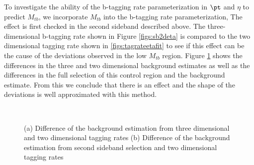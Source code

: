 To investigate the ability of the b-tagging rate parameterization in
$\pt$ and $\eta$ to predict $M_{tb}$, we incorporate $M_{tb}$ into the
b-tagging rate parameterization,  The effect is first checked in the
second sideband described above.  The three-dimensional b-tagging rate
shown in Figure \ref{figs:sb2deta} is compared to the two dimensional
tagging rate shown in \ref{figs:tagrateetafit} to see if this effect
can be the cause of the deviations observed in the low $M_{tb}$
region.  Figure \ref{figs:sb2comp} shows the differences in the three
and two dimensional background estimates as well as the differences in
the full selection of this control region and the background estimate.
From this we conclude that there is an effect and the shape of the
deviations is well approximated with this method.

\begin{figure}[Htcb]
\begin{center}
\\
\caption{
(a) Difference of the background estimation from three dimensional and two dimensional tagging rates
(b) Difference of the background estimation from second sideband selection and two dimensional tagging rates
}
\label{figs:sb2comp}
\end{center}
\end{figure}


